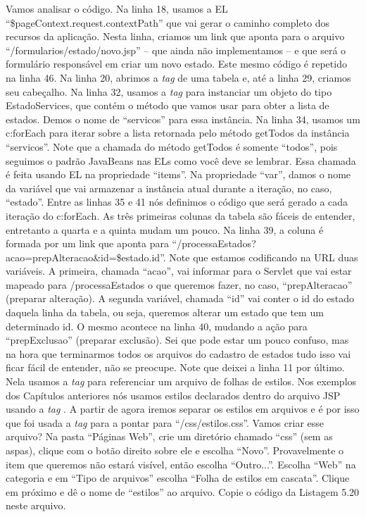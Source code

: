 Vamos analisar o código. Na linha 18, usamos a EL ``\${pageContext.request.contextPath}'' que vai gerar o caminho completo dos recursos da aplicação. Nesta linha, criamos um link que aponta para o arquivo ``/formularios/estado/novo.jsp'' – que ainda não implementamos – e que será o formulário responsável em criar um novo estado. Este mesmo código é repetido na linha 46. Na linha 20, abrimos a \textit{tag} de uma tabela e, até a linha 29, criamos seu cabeçalho. Na linha 32, usamos a \textit{tag}  para instanciar um objeto do tipo EstadoServices, que contém o método que vamos usar para obter a lista de estados. Demos o nome de ``servicos'' para essa instância. Na linha 34, usamos um c:forEach para iterar sobre a lista retornada pelo método getTodos da instância ``servicos''. Note que a chamada do método getTodos é somente ``todos'', pois seguimos o padrão JavaBeans nas ELs como você deve se lembrar. Essa chamada é feita usando EL na propriedade ``items''. Na propriedade ``var'', damos o nome da variável que vai armazenar a instância atual durante a iteração, no caso, ``estado''. Entre as linhas 35 e 41 nós definimos o código que será gerado a cada iteração do c:forEach. As três primeiras colunas da tabela são fáceis de entender, entretanto a quarta e a quinta mudam um pouco. Na linha 39, a coluna é formada por um link que aponta para ``/processaEstados?acao=prepAlteracao\&id=\${estado.id}''. Note que estamos codificando na URL duas variáveis. A primeira, chamada ``acao'', vai informar para o Servlet que vai estar mapeado para /processaEstados o que queremos fazer, no caso, ``prepAlteracao'' (preparar alteração). A segunda variável, chamada ``id'' vai conter o id do estado daquela linha da tabela, ou seja, queremos alterar um estado que tem um determinado id. O mesmo acontece na linha 40, mudando a ação para ``prepExclusao'' (preparar exclusão). Sei que pode estar um pouco confuso, mas na hora que terminarmos todos os arquivos do cadastro de estados tudo isso vai ficar fácil de entender, não se preocupe.
Note que deixei a linha 11 por último. Nela usamos a \textit{tag}  para referenciar um arquivo de folhas de estilos. Nos exemplos dos Capítulos anteriores nós usamos estilos declarados dentro do arquivo JSP usando a \textit{tag} . A partir de agora iremos separar os estilos em arquivos e é por isso que foi usada a \textit{tag}  para a pontar para ``/css/estilos.css''. Vamos criar esse arquivo? Na pasta ``Páginas Web'', crie um diretório chamado ``css'' (sem as aspas), clique com o botão direito sobre ele e escolha ``Novo''. Provavelmente o item que queremos não estará visível, então escolha ``Outro...''. Escolha ``Web'' na categoria e em ``Tipo de arquivos'' escolha ``Folha de estilos em cascata''. Clique em próximo e dê o nome de ``estilos'' ao arquivo. Copie o código da Listagem 5.20 neste arquivo.

